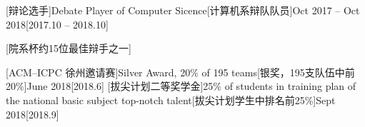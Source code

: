 \documentclass[language=english]{bilingualcv}
\begin{document}
\begin{activity}
    [辩论选手]{Debate Player of Computer Sicence}[计算机系辩队队员]{Oct 2017 -- Oct 2018}[2017.10 -- 2018.10]
    \begin{detail}
        [院系杯约15位最佳辩手之一]
    \end{detail}
\end{activity}
\begin{honor}
    [ACM--ICPC 徐州邀请赛]{Silver Award, 20\% of 195 teams}[银奖，195支队伍中前20\%]{June 2018}[2018.6]
    [拔尖计划二等奖学金]{25\% of students in training plan of the national basic subject top-notch talent}[拔尖计划学生中排名前25\%]{Sept 2018}[2018.9]
\end{honor}
\makedate
\end{document}

